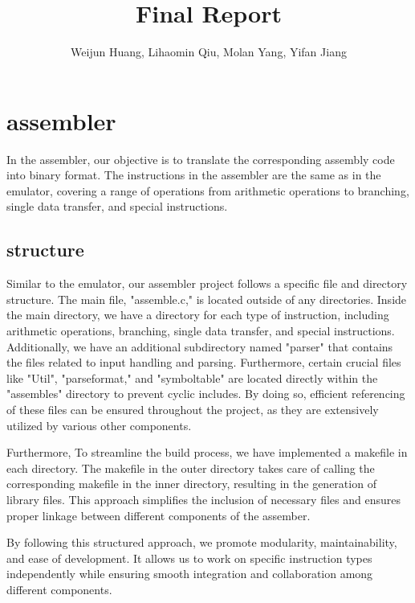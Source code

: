 \documentclass[11pt]{article}
\begin{document}
\title{Final Report}
\author{Weijun Huang, Lihaomin Qiu, Molan Yang, Yifan Jiang}

\maketitle

\section{assembler}

In the assembler, our objective is to translate the corresponding assembly code into binary format. The instructions in the assembler are the same as in the emulator, covering a range of operations from arithmetic operations to branching, single data transfer, and special instructions.

\subsection{structure}

Similar to the emulator, our assembler project follows a specific file and directory structure.  The main file, "assemble.c," is located outside of any directories. Inside the main directory, we have a directory for each type of instruction, including arithmetic operations, branching, single data transfer, and special instructions. Additionally, we have an additional subdirectory named "parser" that contains the files related to input handling and parsing. Furthermore, certain crucial files like "Util", "parseformat," and "symboltable" are located directly within the "assembles" directory to prevent cyclic includes. By doing so, efficient referencing of these files can be ensured throughout the project, as they are extensively utilized by various other components.

Furthermore, To streamline the build process, we have implemented a makefile in each directory. The makefile in the outer directory takes care of calling the corresponding makefile in the inner directory, resulting in the generation of library files. This approach simplifies the inclusion of necessary files and ensures proper linkage between different components of the assember.

By following this structured approach, we promote modularity, maintainability, and ease of development. It allows us to work on specific instruction types independently while ensuring smooth integration and collaboration among different components.
\end{document}
